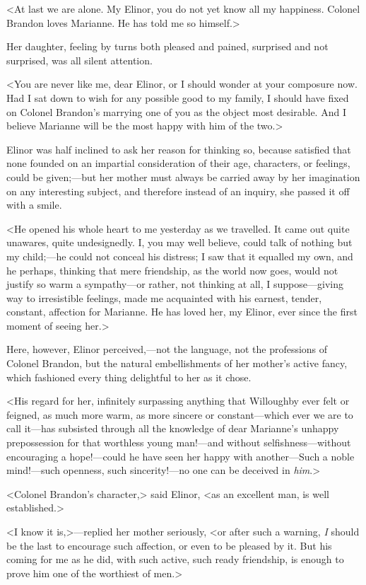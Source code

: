 <At last we are alone. My Elinor, you do not yet know all my happiness. Colonel Brandon loves Marianne. He has told me so himself.>

Her daughter, feeling by turns both pleased and pained, surprised and not surprised, was all silent attention.

<You are never like me, dear Elinor, or I should wonder at your composure now. Had I sat down to wish for any possible good to my family, I should have fixed on Colonel Brandon's marrying one of you as the object most desirable. And I believe Marianne will be the most happy with him of the two.>

Elinor was half inclined to ask her reason for thinking so, because satisfied that none founded on an impartial consideration of their age, characters, or feelings, could be given;—but her mother must always be carried away by her imagination on any interesting subject, and therefore instead of an inquiry, she passed it off with a smile.

<He opened his whole heart to me yesterday as we travelled. It came out quite unawares, quite undesignedly. I, you may well believe, could talk of nothing but my child;—he could not conceal his distress; I saw that it equalled my own, and he perhaps, thinking that mere friendship, as the world now goes, would not justify so warm a sympathy—or rather, not thinking at all, I suppose—giving way to irresistible feelings, made me acquainted with his earnest, tender, constant, affection for Marianne. He has loved her, my Elinor, ever since the first moment of seeing her.>

Here, however, Elinor perceived,—not the language, not the professions of Colonel Brandon, but the natural embellishments of her mother's active fancy, which fashioned every thing delightful to her as it chose.

<His regard for her, infinitely surpassing anything that Willoughby ever felt or feigned, as much more warm, as more sincere or constant—which ever we are to call it—has subsisted through all the knowledge of dear Marianne's unhappy prepossession for that worthless young man!—and without selfishness—without encouraging a hope!—could he have seen her happy with another—Such a noble mind!—such openness, such sincerity!—no one can be deceived in \textit{him}.>

<Colonel Brandon's character,> said Elinor, <as an excellent man, is well established.>

<I know it is,>—replied her mother seriously, <or after such a warning, \textit{I} should be the last to encourage such affection, or even to be pleased by it. But his coming for me as he did, with such active, such ready friendship, is enough to prove him one of the worthiest of men.>

